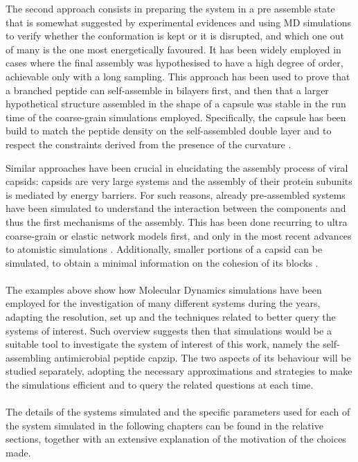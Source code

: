 The second approach consists in preparing the system in a pre assemble state that is somewhat suggested by experimental evidences and using MD simulations to verify whether the conformation is kept or it is disrupted, and which one out of many is the one most energetically favoured. It has been widely employed in cases where the final assembly was hypothesised to have a high degree of order, achievable only with a long sampling. 
%
This approach has been used to prove that a branched peptide can self-assemble in bilayers first, and then that a larger hypothetical structure assembled in the shape of a capsule was stable in the run time of the coarse-grain simulations employed. Specifically, the capsule has been build to match the peptide density on the self-assembled double layer and to respect the constraints derived from the presence of the curvature \cite{Gudlur2012}.

Similar approaches have been crucial in elucidating the assembly process of viral capsids: capsids are very large systems and the assembly of their protein subunits is mediated by energy barriers. For such reasons, already pre-assembled systems have been simulated to understand the interaction between the components and thus the first mechanisms of the assembly. This has been done recurring to ultra coarse-grain or elastic network models \cite{Grime2016} first, and only in the most recent advances to atomistic simulations \cite{Perilla2016,Hadden2018}. Additionally, smaller portions of a capsid can be simulated, to obtain a minimal information on the cohesion of its blocks \cite{AbiMansour2014}.


\paragraph{}
The examples above show how Molecular Dynamics simulations have been employed for the investigation of many different systems during the years, adapting the resolution, set up and the techniques related to better query the systems of interest. Such overview suggests then that simulations would be a suitable tool to investigate the system of interest of this work, namely the self-assembling antimicrobial peptide capzip. The two aspects of its behaviour will be studied separately, adopting the necessary approximations and strategies to make the simulations efficient and to query the related questions at each time.

\paragraph{}
The details of the systems simulated and the specific parameters used for each of the system simulated in the following chapters can be found in the relative sections, together with an extensive explanation of the motivation of the choices made.